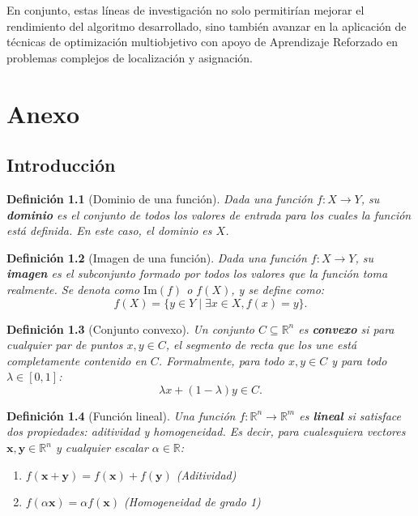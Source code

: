 \documentclass[12pt,a4paper]{book}
\newtheorem{defi}{Definición}[section]
\begin{document}
En conjunto, estas líneas de investigación no solo permitirían mejorar el rendimiento del algoritmo desarrollado, sino también avanzar en la aplicación de técnicas de optimización multiobjetivo con apoyo de Aprendizaje Reforzado en problemas complejos de localización y asignación.  








\chapter{Anexo}
\section{Introducción}
\begin{defi}[Dominio de una función]
\label{def:dominio}
Dada una función $f: X \to Y$, su \textbf{dominio} es el conjunto de todos los valores de entrada para los cuales la función está definida. En este caso, el dominio es $X$.
\end{defi}

\begin{defi}[Imagen de una función]
Dada una función $f: X \to Y$, su \textbf{imagen} es el subconjunto formado por todos los valores que la función toma realmente. Se denota como $\text{Im}(f)$ o $f(X)$, y se define como:
$$ f(X) = \{y \in Y \mid \exists x \in X, f(x) = y \} .$$
\end{defi}

\begin{defi}[Conjunto convexo]
\label{def:convexo}
Un conjunto $C \subseteq \mathbb{R}^n$ es \textbf{convexo} si para cualquier par de puntos $x, y \in C$, el segmento de recta que los une está completamente contenido en $C$. Formalmente, para todo $x, y \in C$ y para todo $\lambda \in [0, 1]$:
$$ \lambda x + (1-\lambda)y \in C .$$
\end{defi}

\begin{defi}[Función lineal]
\label{def:f_lineal}
Una función $f: \mathbb{R}^n \to \mathbb{R}^m$ es \textbf{lineal} si satisface dos propiedades: aditividad y homogeneidad. Es decir, para cualesquiera vectores $\mathbf{x}, \mathbf{y} \in \mathbb{R}^n$ y cualquier escalar $\alpha \in \mathbb{R}$:
\begin{enumerate}
    \item $f(\mathbf{x}+\mathbf{y}) = f(\mathbf{x}) + f(\mathbf{y})$ (Aditividad)
    \item $f(\alpha \mathbf{x}) = \alpha f(\mathbf{x})$ (Homogeneidad de grado 1)
\end{enumerate}
\end{defi}
\end{document}

